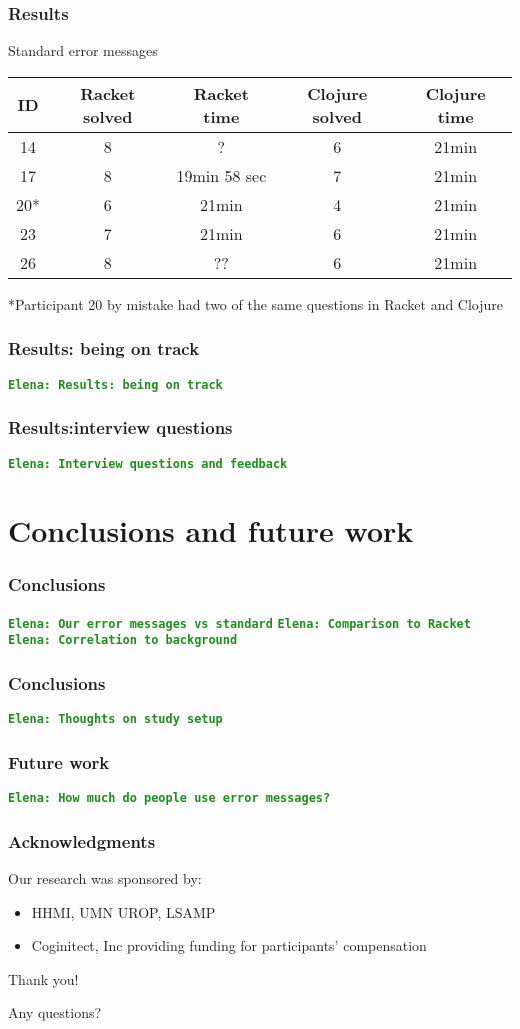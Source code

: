 \documentclass{beamer}
\newcommand{\comment}[1]{{\bf \tt  {#1}}}
\newcommand{\emcomment}[1]{\textcolor{ForestGreen}{\comment{Elena: {#1}}}}
\begin{document}
\begin{frame}
\frametitle{Results}
Standard error messages
\begin{tabular}{c | c| c| c | c }
\hline
{\bf ID} & {\bf Racket solved} & {\bf Racket time} & {\bf Clojure solved} & {\bf Clojure time} \\
\hline 
14 &  8 & ? &  6  &  21min \\
17 &  8 & 19min 58 sec &  7 &  21min \\
20* &  6 & 21min &  4 &  21min \\
23 &  7 & 21min &  6  &  21min \\
26 &  8 & ?? &  6 &  21min \\
\hline
\end{tabular}

*Participant 20 by mistake had two of the same questions in Racket and Clojure
\end{frame}

\begin{frame}
\frametitle{Results: being on track}
\emcomment{Results: being on track}
\end{frame}

\begin{frame}
\frametitle{Results:interview questions}
\emcomment{Interview questions and feedback}
\end{frame}

\section{Conclusions and future work}

\frametitle{Conclusions}
\begin{frame}
\emcomment{Our error messages vs standard}
\emcomment{Comparison to Racket}
\emcomment{Correlation to background}
\end{frame}

\begin{frame}
\frametitle{Conclusions}
\emcomment{Thoughts on study setup}
\end{frame}

\begin{frame}
\frametitle{Future work}
\emcomment{How much do people use error messages?}
\end{frame}

\begin{frame}
\frametitle{Acknowledgments}
	Our research was sponsored by:
	\begin{itemize}
	\item HHMI, UMN UROP, LSAMP
        \item Coginitect, Inc providing funding for participants' compensation 
	\end{itemize}
	{\centering
	\noindent
	Thank you! \par
	Any questions? \par
	}
\end{frame}
\end{document}
